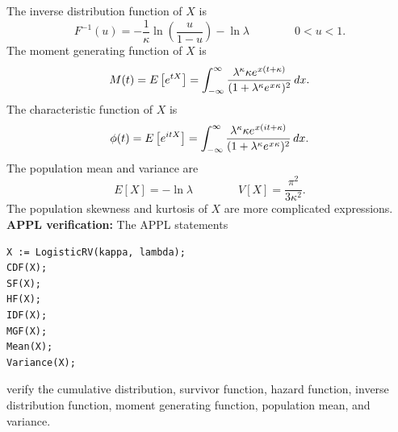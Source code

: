 \documentclass[12pt,fullpage]{article}
\begin{document}
The inverse distribution function of $X$ is
$$
F ^ {-1}(u) = - \frac{1}{\kappa} \ln \left(\frac{u}{1-u} \right) - \ln \lambda \qquad \qquad 0 < u < 1.
$$
The moment generating function of $X$ is
$$
M(t) = E\left[ e ^ {tX} \right] =
\displaystyle \int_{-\infty} ^\infty \frac{\lambda^\kappa \kappa e^{\kern 0.04 em x(t+\kappa)}}{(1+ \lambda^\kappa e^{\kern 0.04 em x\kern 0.04 em \kappa})^2} \, dx.
$$
The characteristic function of $X$ is
$$
\phi(t) = E\left[ e ^ {itX} \right] =
\displaystyle \int_{-\infty} ^\infty \frac{\lambda^\kappa \kappa e^{\kern 0.04 emx(it+\kappa)}}{(1+ \lambda^\kappa e^{\kern 0.04 em x \kern 0.04 em \kappa})^2} \, dx.
$$
The population mean and variance are
$$
E[X] = -\ln \lambda \qquad \qquad 
V[X] = \frac{\pi^2}{3 \kappa^2}. 
$$
The population skewness and kurtosis of $X$ are more complicated expressions. \\

\noindent
{\bf APPL verification:}
The APPL statements
\begin{verbatim}
X := LogisticRV(kappa, lambda);
CDF(X);
SF(X);
HF(X);
IDF(X);
MGF(X);
Mean(X);
Variance(X);
\end{verbatim}
verify the cumulative distribution, survivor function, hazard function,  inverse distribution function, moment generating function, population mean, and variance.
\end{document}
